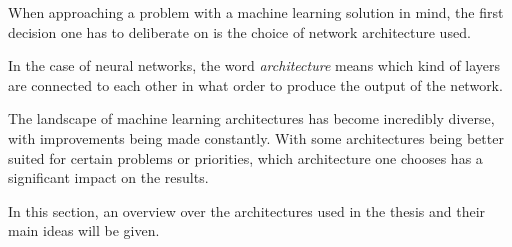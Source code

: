 When approaching a problem with a machine learning solution in mind, the first decision one has to deliberate on is the choice of network architecture used. 

In the case of neural networks, the word \emph{architecture} means which kind of layers are connected to each other in what order to produce the output of the network.

The landscape of machine learning architectures has become incredibly diverse, with improvements being made constantly.
With some architectures being better suited for certain problems or priorities, which architecture one chooses has a significant impact on the results.

In this section, an overview over the architectures used in the thesis and their main ideas will be given.